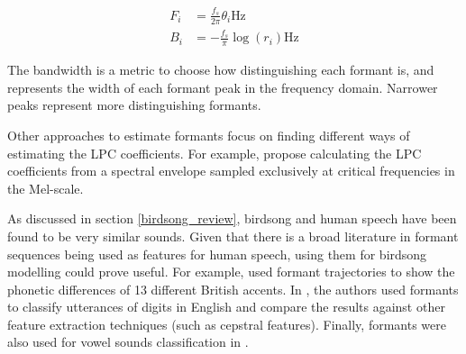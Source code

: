 \documentclass[../main.tex]{subfiles}
\begin{document}
\begin{align*}
F_i &= \frac{f_s}{2\pi}\theta_i \text{Hz}\\
B_i &= -\frac{f_s}{\pi}\log{(r_i)} \text{Hz}
\end{align*}
\par The bandwidth is a metric to choose how distinguishing each formant is, and represents the width of each formant peak in the frequency domain. Narrower peaks represent more distinguishing formants. 
\par Other approaches to estimate formants focus on finding different ways of estimating the LPC coefficients. For example, \cite{Darch,Araujo1998} propose calculating the LPC coefficients from a spectral envelope sampled exclusively at critical frequencies in the Mel-scale.
\par As discussed in section \ref{birdsong_review}, birdsong and human speech have been found to be very similar sounds. Given that there is a broad literature in formant sequences being used as features for human speech, using them for birdsong modelling could prove useful. For example, \cite{Ferragne2010} used formant trajectories to show the phonetic differences of 13 different British accents. In \cite{Holmes1895}, the authors used formants to classify utterances of digits in English and compare the results against other feature extraction techniques (such as cepstral features). Finally, formants were also used for vowel sounds classification in \cite{markel1976}.
\end{document}
